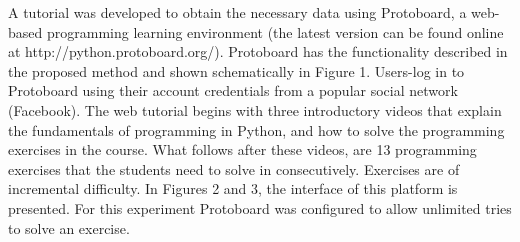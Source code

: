 \documentclass[conference]{IEEEtran}
\begin{document}
A tutorial was developed to
obtain the necessary data using Protoboard, a web-based programming learning
environment (the latest version can be found online at
http://python.protoboard.org/). Protoboard has the functionality described in
the proposed method and shown schematically in Figure 1. Users-log in to
Protoboard using their account credentials from a popular social network
(Facebook).  The web tutorial begins with three introductory videos that explain
the fundamentals of programming in Python, and how to solve the programming
exercises in the course. What follows after these videos, are 13 programming
exercises that the students need to solve in consecutively. Exercises are of
incremental difficulty. In Figures 2 and 3, the interface of this platform is
presented. For this experiment Protoboard was configured to allow unlimited
tries to solve an exercise.
\end{document}
